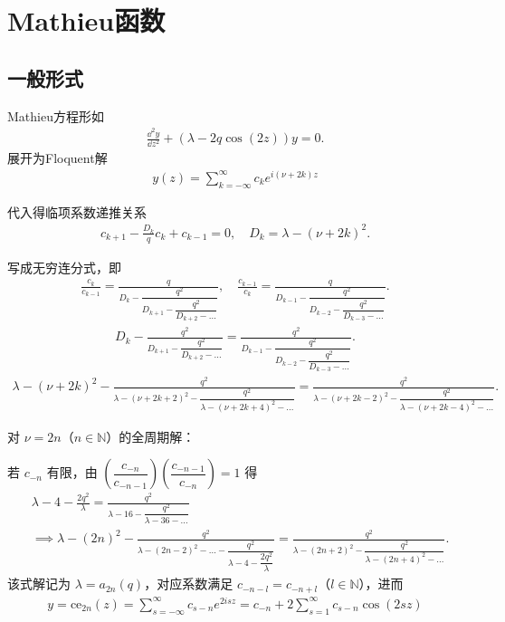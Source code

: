\chapter{Mathieu函数}
\section{一般形式}
Mathieu方程形如
\begin{align*}
	\frac{\dd^2 y}{\dd z^2} + (\lambda - 2q \cos(2z)) y = 0.
\end{align*}
展开为Floquent解
\begin{align*}
	y(z) = \sum_{k=-\infty}^{\infty} c_k e^{i(\nu + 2k)z}
\end{align*}

代入得临项系数递推关系
\begin{align*}
	c_{k+1} - \frac{D_k}{q} c_k + c_{k-1} = 0, \quad D_k = \lambda - (\nu + 2k)^2.
\end{align*}

写成无穷连分式，即
\begin{align*}
	\frac{c_k}{c_{k-1}} = \frac{q}{D_k - \dfrac{q^2}{D_{k+1} - \dfrac{q^2}{D_{k+2} - \dots}}}, \quad \frac{c_{k-1}}{c_k} = \frac{q}{D_{k-1} - \dfrac{q^2}{D_{k-2} - \dfrac{q^2}{D_{k-3} - \dots}}}.
\end{align*}
\begin{align*}
	D_k - \frac{q^2}{D_{k+1} - \dfrac{q^2}{D_{k+2} - \dots}} = \frac{q^2}{D_{k-1} - \dfrac{q^2}{D_{k-2} - \dfrac{q^2}{D_{k-3} - \dots}}}.
\end{align*}
\begin{align*}
	\lambda - (\nu + 2k)^2 - \frac{q^2}{\lambda - (\nu + 2k + 2)^2 - \dfrac{q^2}{\lambda - (\nu + 2k + 4)^2 - \dots}} = \frac{q^2}{\lambda - (\nu + 2k - 2)^2 - \dfrac{q^2}{\lambda - (\nu + 2k - 4)^2 - \dots}}.
\end{align*}

对 \(\nu = 2n\)（\(n \in \mathbb{N}\)）的全周期解：

若 \(c_{-n}\) 有限，由 \(\left( \dfrac{c_{-n}}{c_{-n-1}} \right) \left( \dfrac{c_{-n-1}}{c_{-n}} \right) = 1\) 得
\begin{align*}
	 & \lambda - 4 - \frac{2q^2}{\lambda} = \frac{q^2}{\lambda - 16 - \dfrac{q^2}{\lambda - 36 - \dots}}                                                                                                       \\
	 & \implies \lambda - (2n)^2 - \frac{q^2}{\lambda - (2n - 2)^2 - \dots - \dfrac{q^2}{\lambda - 4 - \dfrac{2q^2}{\lambda}}} = \frac{q^2}{\lambda - (2n + 2)^2 - \dfrac{q^2}{\lambda - (2n + 4)^2 - \dots}}.
\end{align*}
该式解记为 \(\lambda = a_{2n}(q)\)，对应系数满足 \(c_{-n-l} = c_{-n+l}\)（\(l \in \mathbb{N}\)），进而
\begin{align*}
	y = \mathrm{ce}_{2n}(z) = \sum_{s=-\infty}^{\infty} c_{s-n} e^{2isz} = c_{-n} + 2 \sum_{s=1}^{\infty} c_{s-n} \cos(2sz)
\end{align*}

